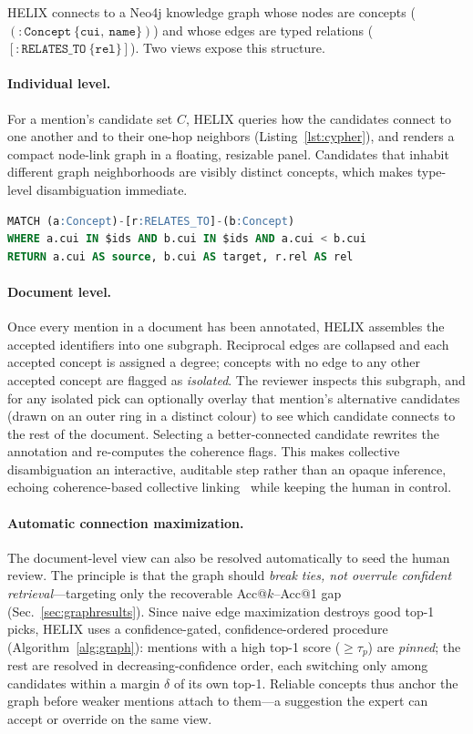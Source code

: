\documentclass[runningheads]{llncs}
\begin{document}
HELIX connects to a Neo4j knowledge graph whose nodes are concepts
($\mathtt{(:Concept\ \{cui,\ name\})}$) and whose edges are typed relations
($\mathtt{[:RELATES\_TO\ \{rel\}]}$). Two views expose this structure.

\paragraph{Individual level.}
For a mention's candidate set $C$, HELIX queries how the candidates connect to one
another and to their one-hop neighbors (Listing~\ref{lst:cypher}), and renders a
compact node-link graph in a floating, resizable panel. Candidates that inhabit
different graph neighborhoods are visibly distinct concepts, which makes
type-level disambiguation immediate.

\begin{lstlisting}[caption={Candidate-neighborhood query (edges among candidates
plus capped one-hop neighbours).},label={lst:cypher},language=SQL]
MATCH (a:Concept)-[r:RELATES_TO]-(b:Concept)
WHERE a.cui IN $ids AND b.cui IN $ids AND a.cui < b.cui
RETURN a.cui AS source, b.cui AS target, r.rel AS rel
\end{lstlisting}

\paragraph{Document level.}
Once every mention in a document has been annotated, HELIX assembles the accepted
identifiers into one subgraph. Reciprocal edges are collapsed and each accepted
concept is assigned a degree; concepts with no edge to any other accepted concept
are flagged as \emph{isolated}. The reviewer inspects this subgraph, and for any
isolated pick can optionally overlay that mention's alternative candidates
(drawn on an outer ring in a distinct colour) to see which candidate connects to
the rest of the document. Selecting a better-connected candidate rewrites the
annotation and re-computes the coherence flags. This makes collective
disambiguation an interactive, auditable step rather than an opaque inference,
echoing coherence-based collective linking~\cite{collective2020,kgdisamb2021}
while keeping the human in control.

\paragraph{Automatic connection maximization.}
The document-level view can also be resolved automatically to seed the human
review. The principle is that the graph should \emph{break ties, not overrule
confident retrieval}---targeting only the recoverable Acc@$k$--Acc@1 gap
(Sec.~\ref{sec:graphresults}). Since naive edge maximization destroys good top-1
picks, HELIX uses a confidence-gated, confidence-ordered procedure
(Algorithm~\ref{alg:graph}): mentions with a high top-1 score ($\ge\tau_p$) are
\emph{pinned}; the rest are resolved in decreasing-confidence order, each switching
only among candidates within a margin $\delta$ of its own top-1. Reliable concepts
thus anchor the graph before weaker mentions attach to them---a suggestion the
expert can accept or override on the same view.
\end{document}

